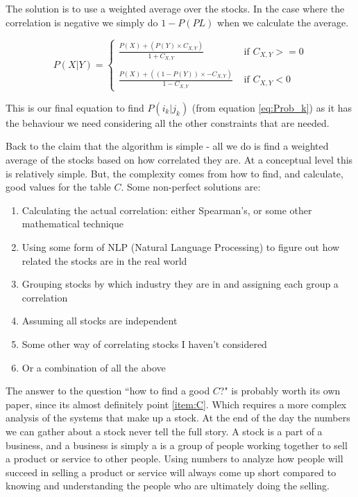 \documentclass[11pt]{article}
\begin{document}
    The solution is to use a weighted average over the stocks.
    In the case where the correlation is negative we simply do \(1 - P(PL)\)
    when we calculate the average.

    \begin{equation} \label{eq:StockWeight}
        P ( X | Y ) = 
        \begin{cases}
            \displaystyle\frac 
                {P( X ) + (P ( Y ) \times C_{X, Y})}
                {1 + C_{X, Y}} 
                & \text{ if } C_{X, Y} >= 0\\
            \\
            \displaystyle\frac
                {P( X ) + ((1 - P ( Y )) \times - C_{X, Y})}
                {1 - C_{X, Y}} 
                & \text{ if } C_{X, Y} < 0
        \end{cases}
    \end{equation}

    This is our final equation to find \(P(i_k | j_k)\) (from equation \ref{eq:Prob_k})
    as it has the behaviour we need considering all the other constraints that are needed.

    Back to the claim that the algorithm is simple - all we do is find a
    weighted average of the stocks based on how correlated they are. At a conceptual level
    this is relatively simple. But, the complexity comes from how to find, and calculate,
    good values for the table \(C\). Some non-perfect solutions are:

    \begin{enumerate}
        \item{Calculating the actual correlation: either Spearman's, or some other mathematical technique}
        \item{Using some form of NLP (Natural Language Processing) to figure out how related the stocks are in the real world}
        \item{Grouping stocks by which industry they are in and assigning each group a correlation}
        \item{Assuming all stocks are independent}
        \item{Some other way of correlating stocks I haven't considered}
        \item{Or a combination of all the above}\label{item:C}
    \end{enumerate}

    The answer to the question ``how to find a good \(C\)?" is probably worth its own paper, since
    its almost definitely point \ref{item:C}. Which requires a more complex analysis of the systems
    that make up a stock. At the end of the day the numbers we can gather about a stock never
    tell the full story. A stock is a part of a business, and a business is simply a is a
    group of people working together to sell a product or service to other people.
    Using numbers to analyze how people will succeed in selling
    a product or service will always come up short compared to knowing and understanding
    the people who are ultimately doing the selling.
\end{document}
